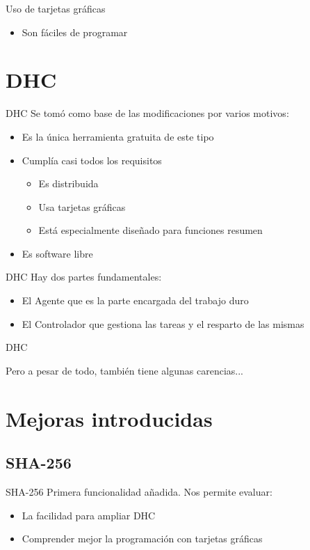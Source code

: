 \documentclass[12pt]{beamer}
\newcommand{\mysection}[1]{\section{#1}}
\begin{document}
\begin{frame}{Uso de tarjetas gráficas}
\begin{itemize}
		\item Son fáciles de programar
			\only<4>{
				\testcode
			}
	\end{itemize}
\end{frame}

\mysection{DHC}
\begin{frame}{DHC}
	Se tomó como base de las modificaciones por varios motivos:
	\pause
	\begin{itemize}
		\item Es la única herramienta gratuita de este tipo
		\item Cumplía casi todos los requisitos
		\begin{itemize}
			\item Es distribuida
			\item Usa tarjetas gráficas
			\item Está especialmente diseñado para funciones resumen
		\end{itemize}
		\item Es software libre
	\end{itemize}
\end{frame}

\begin{frame}{DHC}
	Hay dos partes fundamentales:
	\pause
	\begin{itemize}
		\item El \color{green}Agente \color{white}que es la parte encargada del trabajo duro
		\item El \color{green}Controlador \color{white}que gestiona las tareas y el resparto de las mismas
	\end{itemize}
\end{frame}

\begin{frame}{DHC}
	\begin{center}
		Pero a pesar de todo, también tiene algunas carencias...
	\end{center}
\end{frame}



\mysection{Mejoras introducidas}

\subsection{SHA-256}
\begin{frame}{SHA-256}
	Primera funcionalidad añadida. Nos permite evaluar:
	\pause
	\begin{itemize}
		\item La facilidad para ampliar DHC
		\item Comprender mejor la programación con tarjetas gráficas
	\end{itemize}
\end{frame}
\end{document}
